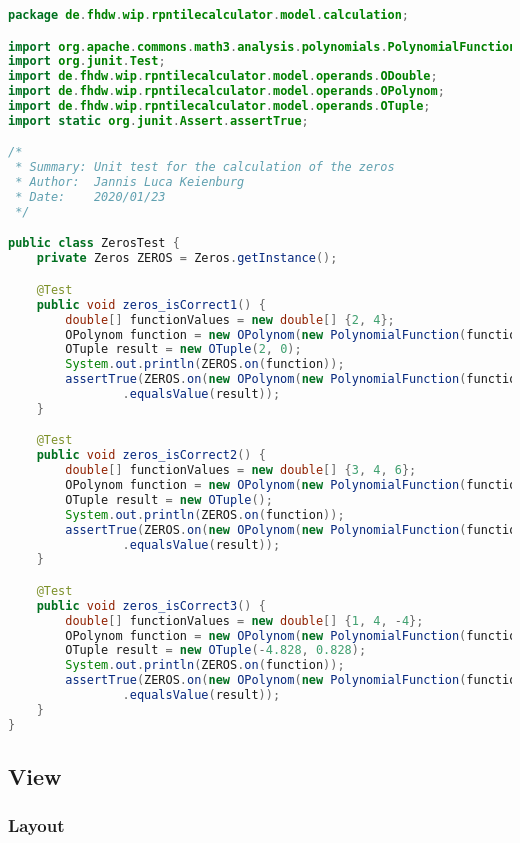 \begin{lstlisting}[caption=ZerosTest (Schwenke),label=list:ZerosTest,language=Java]
package de.fhdw.wip.rpntilecalculator.model.calculation;

import org.apache.commons.math3.analysis.polynomials.PolynomialFunction;
import org.junit.Test;
import de.fhdw.wip.rpntilecalculator.model.operands.ODouble;
import de.fhdw.wip.rpntilecalculator.model.operands.OPolynom;
import de.fhdw.wip.rpntilecalculator.model.operands.OTuple;
import static org.junit.Assert.assertTrue;

/*
 * Summary: Unit test for the calculation of the zeros
 * Author:  Jannis Luca Keienburg
 * Date:    2020/01/23
 */

public class ZerosTest {
    private Zeros ZEROS = Zeros.getInstance();

    @Test
    public void zeros_isCorrect1() {
        double[] functionValues = new double[] {2, 4};
        OPolynom function = new OPolynom(new PolynomialFunction(functionValues));
        OTuple result = new OTuple(2, 0);
        System.out.println(ZEROS.on(function));
        assertTrue(ZEROS.on(new OPolynom(new PolynomialFunction(functionValues)))
                .equalsValue(result));
    }

    @Test
    public void zeros_isCorrect2() {
        double[] functionValues = new double[] {3, 4, 6};
        OPolynom function = new OPolynom(new PolynomialFunction(functionValues));
        OTuple result = new OTuple();
        System.out.println(ZEROS.on(function));
        assertTrue(ZEROS.on(new OPolynom(new PolynomialFunction(functionValues)))
                .equalsValue(result));
    }

    @Test
    public void zeros_isCorrect3() {
        double[] functionValues = new double[] {1, 4, -4};
        OPolynom function = new OPolynom(new PolynomialFunction(functionValues));
        OTuple result = new OTuple(-4.828, 0.828);
        System.out.println(ZEROS.on(function));
        assertTrue(ZEROS.on(new OPolynom(new PolynomialFunction(functionValues)))
                .equalsValue(result));
    }
}
\end{lstlisting} 

\subsection{View}

\subsubsection{Layout}

